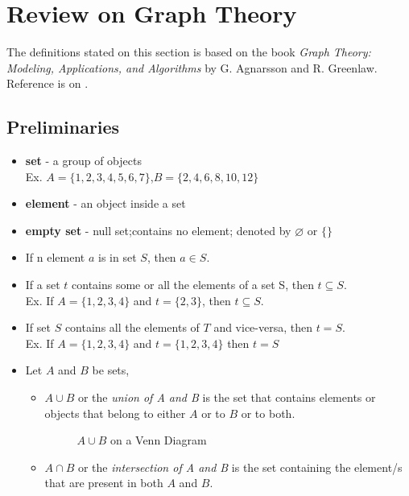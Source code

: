 \section{Review on Graph Theory  }
The definitions stated on this section is based on the book \textit{Graph Theory: Modeling, Applications, and Algorithms} by G. Agnarsson and R. Greenlaw. Reference is on \cite{agnarsson2006graph}.
\subsection{Preliminaries}
\begin{itemize}
\item \textbf{set} - a group of objects\\
Ex. $A=\{1,2,3,4,5,6,7\}$,$B=\{2,4,6,8,10,12\}$ 
\item \textbf{element} - an object inside a set
\item \textbf{empty set} - null set;contains no element; denoted by $\varnothing$ or $\{\}$
\item If n element $a$ is in set $S$, then $a \in S $.
\item If a set $t$ contains some or all the elements of a set S, then $t \subseteq S$.\\
Ex. If $A=\{1,2,3,4\}$ and $t=\{2,3\}$, then $t \subseteq S$.
\item If set $S$ contains all the elements of $T$ and vice-versa, then $t=S$.\\
Ex. If $A=\{1,2,3,4\}$ and $t=\{1,2,3,4\}$ then $t=S$
\item Let $A$ and $B$ be sets,
\begin{itemize}
	\item $A \cup B$ or the \textit{union of A and B} is the set that contains elements or objects that belong to either $A$ or to $B$ or to both.
	\begin{figure}[h!]
	\centering
\caption{$A \cup B$ on a Venn Diagram}
	\end{figure}
	\item $A \cap B$ or the \textit{intersection of A and B} is the set containing the element/s that are present in both $A$ and $B$.
	\begin{figure}[h!]
	\centering

\end{figure}
\end{itemize}
\end{itemize}
